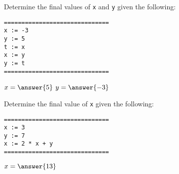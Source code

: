\documentclass{ximera}
\begin{document}
\begin{question}
	Determine the final values of \verb|x| and \verb|y| given the following:
	\begin{verbatim}
==============================
x := -3
y := 5
t := x
x := y
y := t
==============================
	\end{verbatim}
	$x = \answer{5}$
	$y = \answer{-3}$
\end{question}

\begin{question}
	Determine the final value of \verb|x| given the following:
	\begin{verbatim}
==============================
x := 3
y := 7
x := 2 * x + y
==============================
	\end{verbatim}
	$x = \answer{13}$
\end{question}
\end{document}
